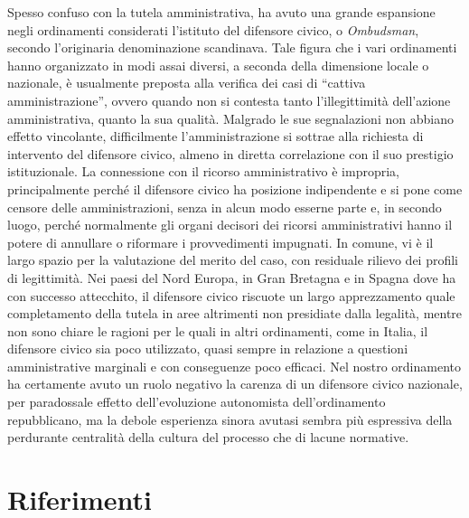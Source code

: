 \documentclass[12pt,it,a4paper,]{report}
\begin{document}
Spesso confuso con la tutela amministrativa, ha avuto una grande
espansione negli ordinamenti considerati l'istituto del difensore
civico, o \emph{Ombudsman}, secondo l'originaria denominazione
scandinava. Tale figura che i vari ordinamenti hanno organizzato in modi
assai diversi, a seconda della dimensione locale o nazionale, è
usualmente preposta alla verifica dei casi di ``cattiva
amministrazione'', ovvero quando non si contesta tanto l'illegittimità
dell'azione amministrativa, quanto la sua qualità. Malgrado le sue
segnalazioni non abbiano effetto vincolante, difficilmente
l'amministrazione si sottrae alla richiesta di intervento del difensore
civico, almeno in diretta correlazione con il suo prestigio
istituzionale. La connessione con il ricorso amministrativo è impropria,
principalmente perché il difensore civico ha posizione indipendente e si
pone come censore delle amministrazioni, senza in alcun modo esserne
parte e, in secondo luogo, perché normalmente gli organi decisori dei
ricorsi amministrativi hanno il potere di annullare o riformare i
provvedimenti impugnati. In comune, vi è il largo spazio per la
valutazione del merito del caso, con residuale rilievo dei profili di
legittimità. Nei paesi del Nord Europa, in Gran Bretagna e in Spagna
dove ha con successo attecchito, il difensore civico riscuote un largo
apprezzamento quale completamento della tutela in aree altrimenti non
presidiate dalla legalità, mentre non sono chiare le ragioni per le
quali in altri ordinamenti, come in Italia, il difensore civico sia poco
utilizzato, quasi sempre in relazione a questioni amministrative
marginali e con conseguenze poco efficaci. Nel nostro ordinamento ha
certamente avuto un ruolo negativo la carenza di un difensore civico
nazionale, per paradossale effetto dell'evoluzione autonomista
dell'ordinamento repubblicano, ma la debole esperienza sinora avutasi
sembra più espressiva della perdurante centralità della cultura del
processo che di lacune normative.

\footnotesize
\singlespacing
\setlength{\parindent}{0in}

\hypertarget{riferimenti}{%
\chapter*{Riferimenti}\label{riferimenti}}
\end{document}
